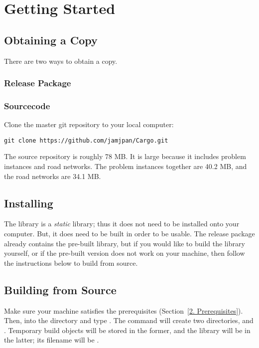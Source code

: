 \section{Getting Started}

\subsection{Obtaining a Copy}

There are two ways to obtain a copy.

\subsubsection{Release Package}

\subsubsection{Sourcecode}

Clone the master  git repository to your local computer:
\begin{verbatim}
git clone https://github.com/jamjpan/Cargo.git
\end{verbatim}

The source repository is roughly 78 MB. It is large because it includes problem
instances and road networks. The problem instances together are 40.2 MB, and
the road networks are 34.1 MB.

\subsection{Installing}

The  library is a \emph{static} library; thus it does not need
to be installed onto your computer. But, it does need to be built in order to
be usable. The release package already contains the pre-built library, but if
you would like to build the library yourself, or if the pre-built version does
not work on your machine, then follow the instructions below to build from source.

\subsection{Building from Source}

Make sure your machine satisfies the prerequisites (Section~\ref{2. Prerequisites}).
Then,  into the  directory and type . The
command will create two directories,  and . Temporary
build objects will be stored in the former, and the library will be in the latter;
its filename will be .

